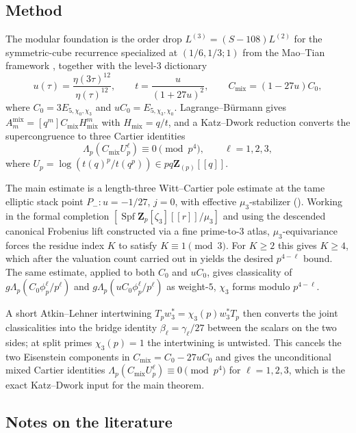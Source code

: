 \documentclass[11pt]{amsart}
\theoremstyle{definition}
\theoremstyle{remark}
\newcommand{\Z}{\mathbf{Z}}
\begin{document}
\subsection*{Method}

The modular foundation is the order drop $L^{(3)}=(S-108)L^{(2)}$ for the symmetric-cube recurrence specialized at $(1/6,1/3;1)$ from the Mao--Tian framework \cite{MT}, together with the level-$3$ dictionary
\[
u(\tau)=\frac{\eta(3\tau)^{12}}{\eta(\tau)^{12}},\qquad
t=\frac{u}{(1+27u)^2},\qquad
C_{\mathrm{mix}}=(1-27u)C_0,
\]
where $C_0=3E_{5,\chi_0,\chi_3}$ and $uC_0=E_{5,\chi_3,\chi_0}$. Lagrange--B\"urmann gives $A_m^{\mathrm{mix}}=[q^m]C_{\mathrm{mix}}H_{\mathrm{mix}}^m$ with $H_{\mathrm{mix}}=q/t$, and a Katz--Dwork reduction converts the supercongruence to three Cartier identities
\[
\Lambda_p(C_{\mathrm{mix}}U_p^\ell)\equiv 0\pmod{p^4},\qquad \ell=1,2,3,
\]
where $U_p=\log(t(q)^p/t(q^p))\in pq\Z_{(p)}[[q]]$.

The main estimate is a length-three Witt--Cartier pole estimate at the tame elliptic stack point $P_-:u=-1/27$, $j=0$, with effective $\mu_3$-stabilizer (). Working in the formal completion $[\operatorname{Spf}\Z_p[\zeta_3][[r]]/\mu_3]$ and using the descended canonical Frobenius lift constructed via a fine prime-to-$3$ atlas, $\mu_3$-equivariance forces the residue index $K$ to satisfy $K\equiv 1\pmod 3$. For $K\ge 2$ this gives $K\ge 4$, which after the valuation count carried out in  yields the desired $p^{4-\ell}$ bound. The same estimate, applied to both $C_0$ and $uC_0$, gives classicality of $g\Lambda_p(C_0\phi_p^\ell/p^\ell)$ and $g\Lambda_p(uC_0\phi_p^\ell/p^\ell)$ as weight-$5$, $\chi_3$ forms modulo $p^{4-\ell}$.

A short Atkin--Lehner intertwining $T_p w_3^*=\chi_3(p)w_3^*T_p$ then converts the joint classicalities into the bridge identity $\beta_\ell=\gamma_\ell/27$ between the scalars on the two sides; at split primes $\chi_3(p)=1$ the intertwining is untwisted. This cancels the two Eisenstein components in $C_{\mathrm{mix}}=C_0-27uC_0$ and gives the unconditional mixed Cartier identities $\Lambda_p(C_{\mathrm{mix}}U_p^\ell)\equiv 0\pmod{p^4}$ for $\ell=1,2,3$, which is the exact Katz--Dwork input for the main theorem.

\subsection*{Notes on the literature}
\end{document}
